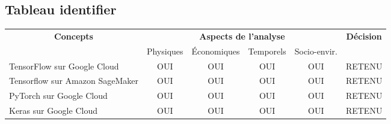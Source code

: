 

\subsection{Tableau identifier}
\label{s:identifier_tableau}

\begin{table}[]
	\begin{tabular}{|l|c|c|c|c|c|}
		\hline
		\multicolumn{1}{|c|}{\multirow{2}{*}{\textbf{Concepts}}} & \multicolumn{4}{c|}{\textbf{Aspects de l'analyse}} & \multirow{2}{*}{\textbf{Décision}} \\ \cline{2-5}
		\multicolumn{1}{|c|}{}                                   & Physiques & Économiques & Temporels & Socio-envir. &                                    \\ \hline
		TensorFlow sur Google Cloud                                                 & OUI       & OUI         & OUI       & OUI          & RETENU                             \\ \hline
		Tensorflow sur Amazon SageMaker                                                 & OUI       & OUI         & OUI       & OUI          & RETENU                             \\ \hline
		PyTorch sur Google Cloud                                                 & OUI       & OUI         & OUI       & OUI          & RETENU                             \\ \hline
		Keras sur Google Cloud                                                 & OUI       & OUI         & OUI       & OUI          & RETENU	        \\ \hline
	\end{tabular}
\end{table}